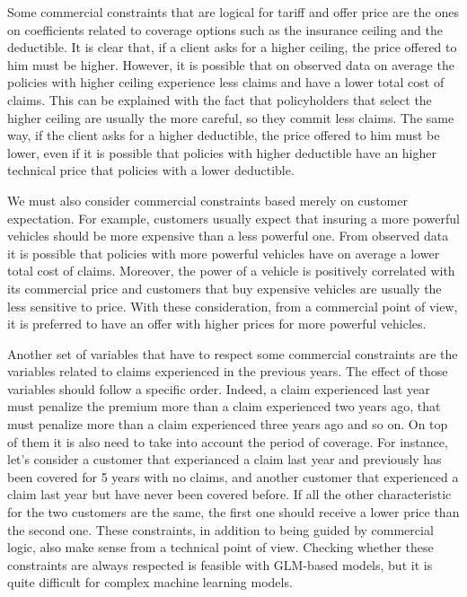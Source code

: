 \documentclass[a4paper, nobind]{templates/ociamthesis}
\theoremstyle{definition}
\theoremstyle{definition}
\theoremstyle{definition}
\theoremstyle{remark}
\begin{document}
Some commercial constraints that are logical for tariff and offer price are the ones on coefficients related to coverage options such as the insurance ceiling and the deductible. It is clear that, if a client asks for a higher ceiling, the price offered to him must be higher. However, it is possible that on observed data on average the policies with higher ceiling experience less claims and have a lower total cost of claims. This can be explained with the fact that policyholders that select the higher ceiling are usually the more careful, so they commit less claims. The same way, if the client asks for a higher deductible, the price offered to him must be lower, even if it is possible that policies with higher deductible have an higher technical price that policies with a lower deductible.

We must also consider commercial constraints based merely on customer expectation. For example, customers usually expect that insuring a more powerful vehicles should be more expensive than a less powerful one. From observed data it is possible that policies with more powerful vehicles have on average a lower total cost of claims. Moreover, the power of a vehicle is positively correlated with its commercial price and customers that buy expensive vehicles are usually the less sensitive to price. With these consideration, from a commercial point of view, it is preferred to have an offer with higher prices for more powerful vehicles.

Another set of variables that have to respect some commercial constraints are the variables related to claims experienced in the previous years. The effect of those variables should follow a specific order. Indeed, a claim experienced last year must penalize the premium more than a claim experienced two years ago, that must penalize more than a claim experienced three years ago and so on. On top of them it is also need to take into account the period of coverage. For instance, let's consider a customer that experianced a claim last year and previously has been covered for 5 years with no claims, and another customer that experienced a claim last year but have never been covered before. If all the other characteristic for the two customers are the same, the first one should receive a lower price than the second one. These constraints, in addition to being guided by commercial logic, also make sense from a technical point of view. Checking whether these constraints are always respected is feasible with GLM-based models, but it is quite difficult for complex machine learning models.
\end{document}
